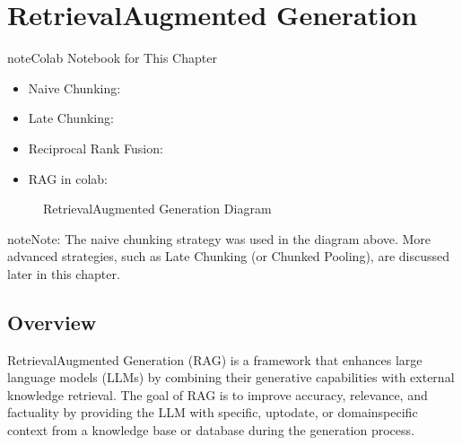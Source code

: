 \documentclass[letterpaper,11pt,english]{sphinxmanual}
\begin{document}
\sphinxstepscope


\chapter{Retrieval\sphinxhyphen{}Augmented Generation}
\label{\detokenize{rag:retrieval-augmented-generation}}\label{\detokenize{rag:rag}}\label{\detokenize{rag::doc}}
\begin{sphinxadmonition}{note}{Colab Notebook for This Chapter}
\begin{itemize}
\item {} 
\sphinxAtStartPar
Naive Chunking: 

\item {} 
\sphinxAtStartPar
Late Chunking: 

\item {} 
\sphinxAtStartPar
Reciprocal Rank Fusion: 

\item {} 
\sphinxAtStartPar
RAG in colab: 

\end{itemize}
\end{sphinxadmonition}

\begin{figure}[htbp]
\centering
\capstart

\noindent{}
\caption{Retrieval\sphinxhyphen{}Augmented Generation Diagram}\label{\detokenize{rag:id2}}\label{\detokenize{rag:fig-rag}}\end{figure}

\begin{sphinxadmonition}{note}{Note:}
\sphinxAtStartPar
The naive chunking strategy was used in the diagram above. More advanced strategies,
such as Late Chunking  (or Chunked Pooling), are discussed later in this chapter.
\end{sphinxadmonition}


\section{Overview}
\label{\detokenize{rag:overview}}
\sphinxAtStartPar
Retrieval\sphinxhyphen{}Augmented Generation (RAG) is a framework that enhances large language models (LLMs)
by combining their generative capabilities with external knowledge retrieval. The goal of RAG
is to improve accuracy, relevance, and factuality by providing the LLM with specific, up\sphinxhyphen{}to\sphinxhyphen{}date,
or domain\sphinxhyphen{}specific context from a knowledge base or database during the generation process.
\end{document}
